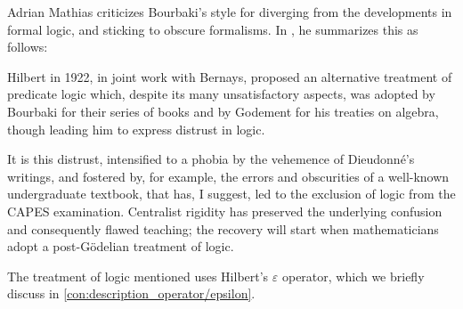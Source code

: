 \begin{remark}
  Adrian Mathias criticizes Bourbaki's style for diverging from the developments in formal logic, and sticking to obscure formalisms. In \cite[48]{Mathias2013BourbakiCriticism}, he summarizes this as follows:
  \begin{displayquote}
    Hilbert in 1922, in joint work with Bernays, proposed an alternative treatment of predicate logic which, despite its many unsatisfactory aspects, was adopted by Bourbaki for their series of books and by Godement for his treaties on algebra, though leading him to express distrust in logic.

    It is this distrust, intensified to a phobia by the vehemence of Dieudonn\'e's writings, and fostered by, for example, the errors and obscurities of a well-known undergraduate textbook, that has, I suggest, led to the exclusion of logic from the CAPES examination. Centralist rigidity has preserved the underlying confusion and consequently flawed teaching; the recovery will start when mathematicians adopt a post-G\"odelian treatment of logic.
  \end{displayquote}

  The treatment of logic mentioned uses Hilbert's \( \varepsilon \) operator, which we briefly discuss in \cref{con:description_operator/epsilon}.
\end{remark}

